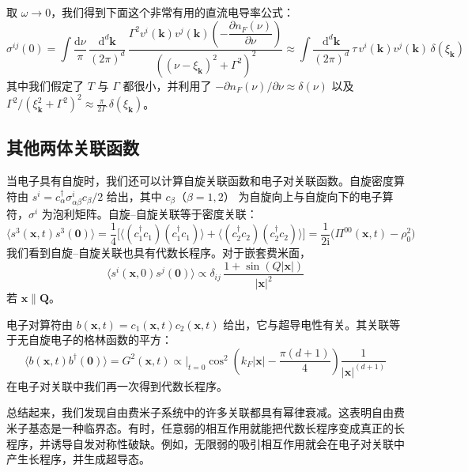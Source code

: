 取 $\omega\to 0$，我们得到下面这个非常有用的直流电导率公式：
\begin{equation*}
\sigma^{ij}(0) = \int \frac{\mathrm{d}\nu}{\pi}\, \frac{\mathrm{d}^d\pmb{k}}{(2\pi)^d}\,
\frac{\Gamma^2 v^i(\pmb{k}) v^j(\pmb{k}) \left(-\dfrac{\partial n_F(\nu)}{\partial \nu}\right)}
{\left((\nu - \xi_{\pmb{k}})^2 + \Gamma^2\right)^2}
\approx \int \frac{\mathrm{d}^d\pmb{k}}{(2\pi)^d}\, \tau\, v^i(\pmb{k}) v^j(\pmb{k})\, \delta(\xi_{\pmb{k}})
\end{equation*}
其中我们假定了 $T$ 与 $\Gamma$ 都很小，并利用了 $-\partial n_F(\nu)/\partial\nu \approx \delta(\nu)$
以及 $\Gamma^2/(\xi_{\pmb{k}}^2 + \Gamma^2)^2 \approx \frac{\pi}{2\Gamma}\,\delta(\xi_{\pmb{k}})$。

\subsection{其他两体关联函数}

当电子具有自旋时，我们还可以计算自旋关联函数和电子对关联函数。自旋密度算符由
$s^i = c_\alpha^\dagger \sigma^i_{\alpha\beta} c_\beta/2$ 给出，其中 $c_\beta$（$\beta = 1, 2$）
为自旋向上与自旋向下的电子算符，$\sigma^i$ 为泡利矩阵。自旋--自旋关联等于密度关联：
\begin{equation*}
\big\langle s^3(\pmb{x},t) s^3(\pmb{0}) \big\rangle
= \frac{1}{4} \Big[ \big\langle (c_1^\dagger c_1)(c_1^\dagger c_1) \big\rangle
+ \big\langle (c_2^\dagger c_2)(c_2^\dagger c_2) \big\rangle \Big]
= \frac{1}{2\mathrm{i}} \big( \Pi^{00}(\pmb{x},t) - \rho_0^2 \big)
\end{equation*}
我们看到自旋--自旋关联也具有代数长程序。对于嵌套费米面，
\begin{equation*}
\big\langle s^i(\pmb{x},0) s^j(\pmb{0}) \big\rangle \propto \delta_{ij}\, \frac{1 + \sin(Q|\pmb{x}|)}{|\pmb{x}|^2}
\end{equation*}
若 $\pmb{x} \| \pmb{Q}$。

电子对算符由 $b(\pmb{x},t) = c_1(\pmb{x},t)c_2(\pmb{x},t)$ 给出，它与超导电性有关。其关联等于无自旋电子的格林函数的平方：
\begin{equation*}
\big\langle b(\pmb{x},t) b^\dagger(\pmb{0}) \big\rangle = G^2(\pmb{x},t)
\propto \Big|_{t=0} \cos^2 \left( k_F |\pmb{x}| - \frac{\pi(d+1)}{4} \right) \frac{1}{|\pmb{x}|^{(d+1)}}
\end{equation*}
在电子对关联中我们再一次得到代数长程序。

总结起来，我们发现自由费米子系统中的许多关联都具有幂律衰减。这表明自由费米子基态是一种临界态。有时，任意弱的相互作用就能把代数长程序变成真正的长程序，并诱导自发对称性破缺。例如，无限弱的吸引相互作用就会在电子对关联中产生长程序，并生成超导态。

